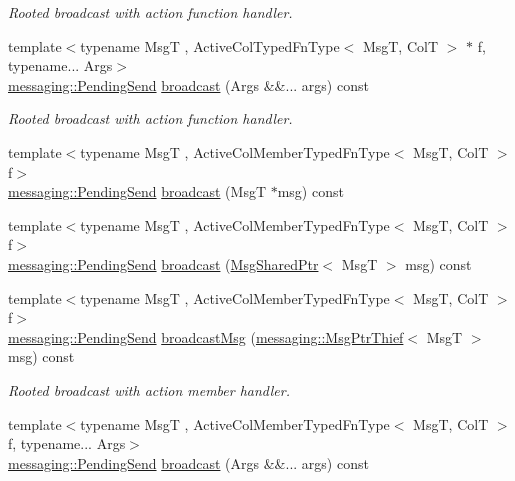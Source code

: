 \begin{DoxyCompactItemize}
\begin{DoxyCompactList}\small\item\em Rooted broadcast with action function handler. \end{DoxyCompactList}\item 
{\footnotesize template$<$typename MsgT , Active\+Col\+Typed\+Fn\+Type$<$ Msg\+T, Col\+T $>$ $\ast$ f, typename... Args$>$ }\\\hyperlink{structvt_1_1messaging_1_1_pending_send}{messaging\+::\+Pending\+Send} \hyperlink{structvt_1_1vrt_1_1collection_1_1_broadcastable_a96cd21a1be6313144a8c4aa3683eaa05}{broadcast} (Args \&\&... args) const
\begin{DoxyCompactList}\small\item\em Rooted broadcast with action function handler. \end{DoxyCompactList}\item 
{\footnotesize template$<$typename MsgT , Active\+Col\+Member\+Typed\+Fn\+Type$<$ Msg\+T, Col\+T $>$ f$>$ }\\\hyperlink{structvt_1_1messaging_1_1_pending_send}{messaging\+::\+Pending\+Send} \hyperlink{structvt_1_1vrt_1_1collection_1_1_broadcastable_a0a08e1ab7c78e36b3ecb5b6a4d399dab}{broadcast} (MsgT $\ast$msg) const
\item 
{\footnotesize template$<$typename MsgT , Active\+Col\+Member\+Typed\+Fn\+Type$<$ Msg\+T, Col\+T $>$ f$>$ }\\\hyperlink{structvt_1_1messaging_1_1_pending_send}{messaging\+::\+Pending\+Send} \hyperlink{structvt_1_1vrt_1_1collection_1_1_broadcastable_a84e88085c04b2293e019faf986a4996a}{broadcast} (\hyperlink{namespacevt_ab2b3d506ec8e8d1540aede826d84a239}{Msg\+Shared\+Ptr}$<$ MsgT $>$ msg) const
\item 
{\footnotesize template$<$typename MsgT , Active\+Col\+Member\+Typed\+Fn\+Type$<$ Msg\+T, Col\+T $>$ f$>$ }\\\hyperlink{structvt_1_1messaging_1_1_pending_send}{messaging\+::\+Pending\+Send} \hyperlink{structvt_1_1vrt_1_1collection_1_1_broadcastable_a520d37e5da6ce89657f6d33162a23003}{broadcast\+Msg} (\hyperlink{structvt_1_1messaging_1_1_msg_ptr_thief}{messaging\+::\+Msg\+Ptr\+Thief}$<$ MsgT $>$ msg) const
\begin{DoxyCompactList}\small\item\em Rooted broadcast with action member handler. \end{DoxyCompactList}\item 
{\footnotesize template$<$typename MsgT , Active\+Col\+Member\+Typed\+Fn\+Type$<$ Msg\+T, Col\+T $>$ f, typename... Args$>$ }\\\hyperlink{structvt_1_1messaging_1_1_pending_send}{messaging\+::\+Pending\+Send} \hyperlink{structvt_1_1vrt_1_1collection_1_1_broadcastable_a96cd21a1be6313144a8c4aa3683eaa05}{broadcast} (Args \&\&... args) const

\end{DoxyCompactItemize}
